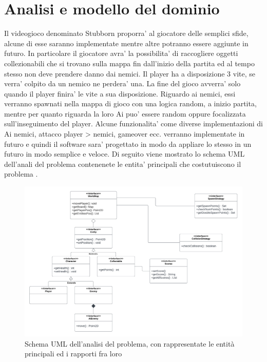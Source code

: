 \documentclass[a4paper,12pt]{report}
\begin{document}
\section{Analisi e modello del dominio}
Il videogioco denominato Stubborn proporra' al giocatore delle semplici sfide, alcune di esse saranno implementate mentre altre potranno essere aggiunte in futuro.
In particolare il giocatore avra' la possibilita' di raccogliere oggetti collezionabili che si trovano sulla mappa fin dall'inizio della partita ed al tempo stesso non deve prendere danno dai nemici.
Il player ha a disposizione 3 vite, se verra' colpito da un nemico ne perdera' una.
La fine del gioco avverra' solo quando il player finira' le vite a sua disposizione.
Riguardo ai nemici, essi verranno spawnati nella mappa di gioco con una logica random, a inizio partita, mentre per quanto riguarda la loro Ai puo' essere random oppure focalizzata sull'inseguimento del player.
Alcune funzionalita' come diverse implementazioni di Ai nemici, attacco player > nemici, gameover ecc. verranno implementate in futuro e quindi il software sara' progettato in modo da appliare lo stesso in un futuro in modo semplice e veloce.
Di seguito viene mostrato lo schema UML dell'anali del problema contenenete le entita' principali che costutuiscono il problema .

\begin{figure}[H]
\centering{}
\includegraphics[width=\textwidth,height=\textheight,keepaspectratio]{img/UML_Analisi_OOP_Project.pdf}
\caption{Schema UML dell'analisi del problema, con rappresentate le entità principali ed i rapporti fra loro}
\label{img:analysisUML}
\end{figure}
\end{document}
